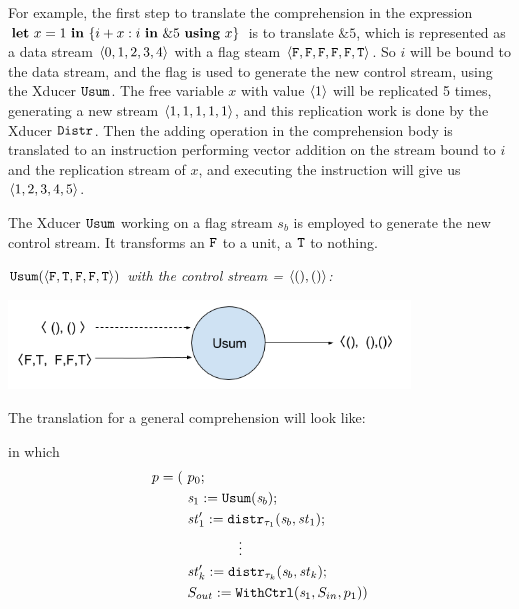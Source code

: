 For example, the first step to translate the comprehension in the expression $\mathbf{let} \ x = 1 \ \mathbf{in} \ \{i+x : i \ \mathbf{in} \ \&5 \ \mathbf{using} \ x\}$ is to translate $\&5$, which is represented as a data stream $\<0,1,2,3,4\'>$ with a flag steam $\<\F,\F,\F,\F,\F,\T\'>$.
So $i$ will be bound to the data stream, and the flag is used to generate the new control stream, using the Xducer $\mathtt{Usum}$.
The free variable $x$ with value $\langle 1 \rangle$ will be replicated 5 times, generating a new stream $\<1,1,1,1,1\'>$, and this replication work is done by the Xducer $\mathtt{Distr}$.
Then the adding operation in the comprehension body is translated to an instruction performing vector addition on the stream bound to $i$ and the replication stream of $x$, and executing the instruction will give us $\<1,2,3,4,5\'>$. 


The Xducer $\mathtt{Usum}$ working on a flag stream $s_b$ is employed to generate the new control stream. It transforms an $\mathtt{F}$ to a unit, a $\mathtt{T}$ to nothing.
\begin{example} \emph{$\usumf{\<\F,\T,\F,\F,\T\'>}$ with the control stream = $\<(),() \'>$:} \\
	\begin{center}
		\includegraphics[width=0.8\textwidth]{fig/usumxducer.png}
	\end{center}
\end{example}

The translation for a general comprehension will look like:\\[3ex]

\def\Distr#1#2#3{\mathtt{distr}_{#3}(#1,#2)}
\def\Pack#1#2#3{\mathtt{pack}_{#3}(#1,#2)}

in which $$ \begin{aligned}
p = ( & \ p_0; \\
    & \ \sdef{\s_1}{\usum(\s_b)}; \\
	& \ \sdef{\st_1'}{\Distr{\s_b}{\st_1}{\tau_1}}; \\
	& \qquad \qquad \vdots \\
	& \ \sdef{\st_k'}{\Distr{\s_b}{\st_k}{\tau_k}}; \\
	& \ \withctrl{\s_1}{p_1}{\Sin}{\Sout} ) \\
\end{aligned}$$	

